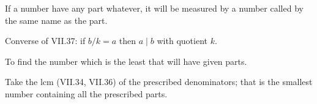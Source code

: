 \begin{claim}
\label{prop:VII.38}
If a number have any part whatever, it will be measured by a number
called by the same name as the part.
\end{claim}
\begin{evidence}
\label{ev:VII.38}
Converse of VII.37: if $b/k = a$ then $a \mid b$ with quotient $k$.
\end{evidence}

\begin{claim}
\label{prop:VII.39}
To find the number which is the least that will have given parts.
\end{claim}
\begin{evidence}
\label{ev:VII.39}
Take the lcm (VII.34, VII.36) of the prescribed denominators; that
is the smallest number containing all the prescribed parts.
\end{evidence}
